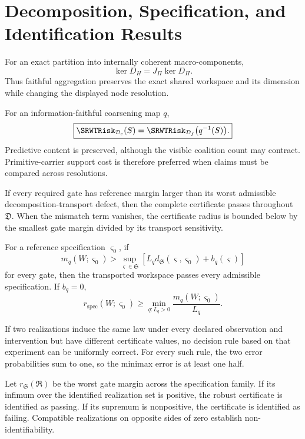 \section{Decomposition, Specification, and Identification Results}

For an exact partition into internally coherent macro-components,
\[
\boxed{
\ker D_H=J_\Pi\ker D_\Pi.
}
\]
Thus faithful aggregation preserves the exact shared workspace and its
dimension while changing the displayed node resolution.

For an information-faithful coarsening map \(q\),
\[
\boxed{
\SRWTRisk_{\mathcal D_c}(S)
=
\SRWTRisk_{\mathcal D_f}\bigl(q^{-1}(S)\bigr).
}
\]
Predictive content is preserved, although the visible coalition count may
contract. Primitive-carrier support cost is therefore preferred when claims
must be compared across resolutions.

If every required gate has reference margin larger than its worst admissible
decomposition-transport defect, then the complete certificate passes
throughout \(\mathfrak D\). When the mismatch term vanishes, the certificate
radius is bounded below by the smallest gate margin divided by its transport
sensitivity.

For a reference specification \(\varsigma_0\), if
\[
m_q(W;\varsigma_0)
>
\sup_{\varsigma\in\mathfrak S}
\left[
L_qd_{\mathfrak S}(\varsigma,\varsigma_0)+b_q(\varsigma)
\right]
\]
for every gate, then the transported workspace passes every admissible
specification. If \(b_q=0\),
\[
r_{\mathrm{spec}}(W;\varsigma_0)
\geq
\min_{q:L_q>0}\frac{m_q(W;\varsigma_0)}{L_q}.
\]

If two realizations induce the same law under every declared observation and
intervention but have different certificate values, no decision rule based on
that experiment can be uniformly correct. For every such rule, the two error
probabilities sum to one, so the minimax error is at least one half.

Let \(r_{\mathfrak S}(\mathfrak R)\) be the worst gate margin across the
specification family. If its infimum over the identified realization set is
positive, the robust certificate is identified as passing. If its supremum is
nonpositive, the certificate is identified as failing. Compatible realizations
on opposite sides of zero establish non-identifiability.

